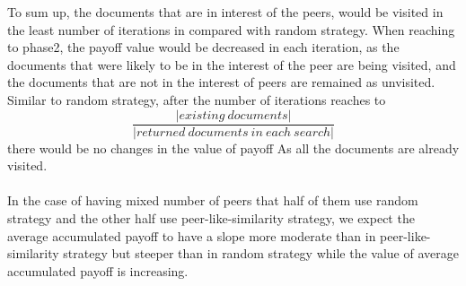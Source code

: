 \documentclass [12pt]{article} \usepackage{multicol}
\begin{document}



 To sum up, the documents that are in interest of the
peers, would be visited in the least number of iterations in
compared with random strategy. When reaching to phase2, the
payoff value would be decreased in each iteration, as the
documents that were likely to be in the interest of the peer
are being visited, and the documents that are not in the interest of peers are remained as unvisited.
Similar to random strategy, after the number of iterations
reaches to $$ \frac {|existing\ documents|}{|returned \
documents\ in\ each\ search|} $$ there would be no changes
in the value of payoff As all the documents are already
visited. 




\paragraph{} In the case of having mixed number of
peers that half of them use random strategy and the other half use peer-like-similarity
strategy, we expect the average accumulated payoff to have a slope
more moderate than in peer-like-similarity strategy but steeper than
in  random strategy while the value of average accumulated payoff is
increasing. 

\end{document}
